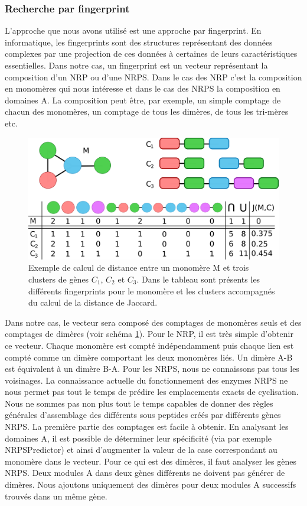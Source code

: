 \subsubsection{Recherche par fingerprint}

L'approche que nous avons utilisé est une approche par fingerprint.
En informatique, les fingerprints sont des structures représentant des données complexes par une projection de ces données à certaines de leurs caractéristiques essentielles.
Dans notre cas, un fingerprint est un vecteur représentant la composition d'un NRP ou d'une NRPS.
Dans le cas des NRP c'est la composition en monomères qui nous intéresse et dans le cas des NRPS la composition en domaines A.
La composition peut être, par exemple, un simple comptage de chacun des monomères, un comptage de tous les dimères, de tous les tri-mères etc.

\begin{figure}[h!]
  \begin{center}
    \includegraphics[width=450px]{Figures/synthese/fingerprints.png}
    \caption{\label{jaccard}Exemple de calcul de distance entre un monomère M et trois clusters de gènes $C_1$, $C_2$ et $C_3$.
    Dans le tableau sont présents les différents fingerprints pour le monomère et les clusters accompagnés du calcul de la distance de Jaccard.}
  \end{center}
\end{figure}

Dans notre cas, le vecteur sera composé des comptages de monomères seuls et des comptages de dimères (voir schéma \ref{jaccard}).
Pour le NRP, il est très simple d'obtenir ce vecteur.
Chaque monomère est compté indépendamment puis chaque lien est compté comme un dimère comportant les deux monomères liés.
Un dimère A-B est équivalent à un dimère B-A.
Pour les NRPS, nous ne connaissons pas tous les voisinages.
La connaissance actuelle du fonctionnement des enzymes NRPS ne nous permet pas tout le temps de prédire les emplacements exacts de cyclisation.
Nous ne sommes pas non plus tout le temps capables de donner des règles générales d'assemblage des différents sous peptides créés par différents gènes NRPS.
La première partie des comptages est facile à obtenir.
En analysant les domaines A, il est possible de déterminer leur spécificité (via par exemple NRPSPredictor) et ainsi d'augmenter la valeur de la case correspondant au monomère dans le vecteur.
Pour ce qui est des dimères, il faut analyser les gènes NRPS.
Deux modules A dans deux gènes différents ne doivent pas générer de dimères.
Nous ajoutons uniquement des dimères pour deux modules A successifs trouvés dans un même gène.

